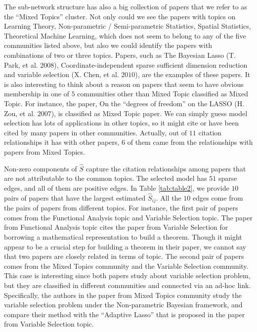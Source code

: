 \documentclass[AMS,STIX1COL]{WileyNJD-v2}
\begin{document}
{The sub-network structure has also a big collection of papers that we refer to as the ``Mixed Topics'' cluster.
Not only could we see the papers with topics on Learning Theory, Non-parametric / Semi-parametric Statistics, Spatial Statistics, Theoretical Machine Learning, which does not seem to belong to any of the five communities listed above, but also we could identify the papers with combinations of two or three topics.
Papers, such as The Bayesian Lasso (T. Park, et al. $2008$), Coordinate-independent sparse sufficient dimension reduction and variable selection (X. Chen, et al. $2010$), are the examples of these papers.
It is also interesting to think about a reason on papers that seem to have obvious membership in one of $5$ communities other than Mixed Topic classified as Mixed Topic.
For instance, the paper, On the ``degrees of freedom'' on the LASSO (H. Zou, et al. $2007$), is classified as Mixed Topic paper.
We can simply guess model selection has lots of applications in other topics, so it might cite or have been cited by many papers in other communities.
Actually, out of $11$ citation relationships it has with other papers, $6$ of them came from the relationships with papers from Mixed Topics.

Non-zero components of $\widehat{S}$ capture the citation relationships among papers that are not attributable to the common topics.
The selected model has $51$ sparse edges, and all of them are positive edges.
In Table \ref{tab:table2}, we provide $10$ pairs of papers that have the largest estimated $\widehat{S}_{ij}$.
All the $10$ edges come from the pairs of papers from different topics.
For instance, the first pair of papers comes from the Functional Analysis topic and Variable Selection topic.
The paper from Functional Analysis topic cites the paper from Variable Selection for borrowing a mathematical representation to build a theorem.
Though it might appear to be a crucial step for building a theorem in their paper, we cannot say that two papers are closely related in terms of topic.
The second pair of papers comes from the Mixed Topics community and the Variable Selection community.
This case is interesting since both papers study about variable selection problem, but they are classified in different communities and connected via an ad-hoc link.
Specifically, the authors in the paper from Mixed Topics community study the variable selection problem under the Non-parametric Bayesian framework, and compare their method with the ``Adaptive Lasso'' that is proposed in the paper from Variable Selection topic.


}
\end{document}
